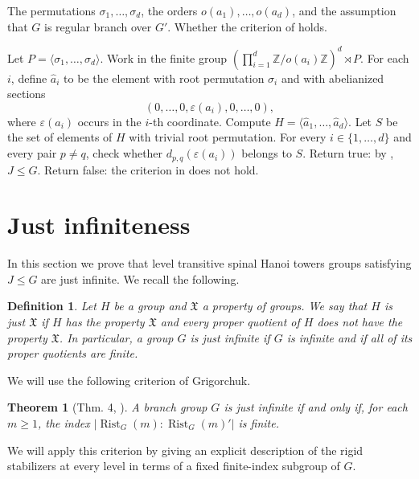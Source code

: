 \documentclass[11pt,leqno]{amsart}
\theoremstyle{plain}
\newtheorem{theorem}{Theorem}[section]
\newtheorem{definition}[definition]{Definition}
\DeclareMathOperator{\Rist}{Rist}
\numberwithin{equation}{section}
\begin{document}
\begin{algorithm}[H]
\caption{Checking the criterion for $J\leq G$}\label{alg:Jcriterion}
\begin{algorithmic}[1]
\Require The permutations $\sigma_1,\ldots,\sigma_d$, the orders $o(a_1),\ldots,o(a_d)$, and the assumption that $G$ is regular branch over $G'$.
\Ensure Whether the criterion of  holds.

\State Let $P=\langle \sigma_1,\ldots,\sigma_d\rangle$.
\State Work in the finite group $\left(\prod_{i=1}^d \mathbb Z/o(a_i)\mathbb Z\right)^d\rtimes P$.
\State For each $i$, define $\widehat a_i$ to be the element with root permutation $\sigma_i$ and with abelianized sections
\[
(0,\ldots,0,\varepsilon(a_i),0,\ldots,0),
\]
where $\varepsilon(a_i)$ occurs in the $i$-th coordinate.
\State Compute $H=\langle \widehat a_1,\ldots,\widehat a_d\rangle$.
\State Let $S$ be the set of elements of $H$ with trivial root permutation.
\State For every $i\in\{1,\ldots,d\}$ and every pair $p\neq q$, check whether $d_{p,q}(\varepsilon(a_i))$ belongs to $S$.
    \State Return true: by , $J\leq G$.
\Else
    \State Return false: the criterion in  does not hold.
\EndIf
\end{algorithmic}
\end{algorithm}



\section{Just infiniteness}\label{secjustinf}
In this section we prove that level transitive spinal Hanoi towers groups satisfying $J\leq G$ are just infinite. We recall the following.

\begin{definition}
Let $H$ be a group and $\mathfrak{X}$ a property of groups. We say that $H$ is \emph{just} $\mathfrak{X}$ if $H$ has the property $\mathfrak{X}$ and every proper quotient of $H$ does not have the property $\mathfrak{X}$.
In particular, a group $G$ is \textit{just infinite}  if $G$ is infinite and if all of its proper quotients are finite.
\end{definition}

We will use the following criterion of Grigorchuk.

\begin{theorem}[Thm. 4, \cite{JI grigorchuk}]
A branch group $G$ is just infinite if and only if, for each $m \geq 1$, the index $|\Rist_G(m):\Rist_G(m)'|$ is finite.
\end{theorem}
We will apply this criterion by giving an explicit description of the rigid stabilizers at every level in terms of a fixed finite-index subgroup of $G$.
\end{document}

